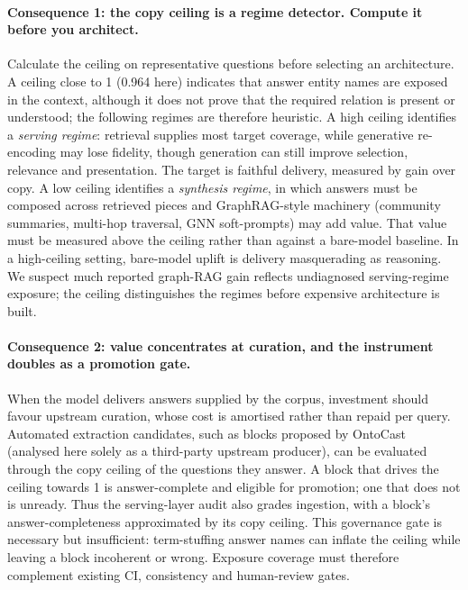 \documentclass[10pt,twocolumn]{article}
\begin{document}
\paragraph{Consequence 1: the copy ceiling is a regime detector. Compute it before you architect.}
Calculate the ceiling on representative questions before selecting an architecture. A ceiling close to 1 (0.964 here) indicates that answer entity names are exposed in the context, although it does not prove that the required relation is present or understood; the following regimes are therefore heuristic. A high ceiling identifies a \emph{serving regime}: retrieval supplies most target coverage, while generative re-encoding may lose fidelity, though generation can still improve selection, relevance and presentation. The target is faithful delivery, measured by gain over copy. A low ceiling identifies a \emph{synthesis regime}, in which answers must be composed across retrieved pieces and GraphRAG-style machinery (community summaries, multi-hop traversal, GNN soft-prompts) may add value. That value must be measured above the ceiling rather than against a bare-model baseline. In a high-ceiling setting, bare-model uplift is delivery masquerading as reasoning. We suspect much reported graph-RAG gain reflects undiagnosed serving-regime exposure; the ceiling distinguishes the regimes before expensive architecture is built.

\paragraph{Consequence 2: value concentrates at curation, and the instrument doubles as a promotion
gate.} When the model delivers answers supplied by the corpus, investment should favour upstream curation, whose cost is amortised rather than repaid per query. Automated extraction candidates, such as blocks proposed by OntoCast~\cite{ontocast} (analysed here solely as a third-party upstream producer), can be evaluated through the copy ceiling of the questions they answer. A block that drives the ceiling towards 1 is answer-complete and eligible for promotion; one that does not is unready. Thus the serving-layer audit also grades ingestion, with a block's answer-completeness approximated by its copy ceiling. This governance gate is necessary but insufficient: term-stuffing answer names can inflate the ceiling while leaving a block incoherent or wrong. Exposure coverage must therefore complement existing CI, consistency and human-review gates.
\end{document}
